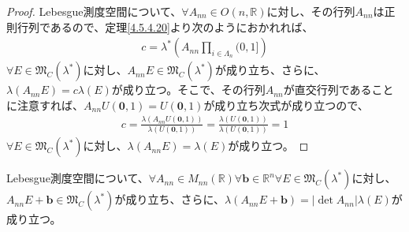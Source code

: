 \documentclass[dvipdfmx]{jsarticle}
\begin{document}
\begin{proof}
Lebesgue測度空間について、$\forall A_{nn} \in O\left( n,\mathbb{R} \right)$に対し、その行列$A_{nn}$は正則行列であるので、定理\ref{4.5.4.20}より次のようにおかれれば、
\begin{align*}
c = \lambda^{*}\left( A_{nn}\prod_{i \in \varLambda_{n}} (0,1] \right)
\end{align*}
$\forall E \in \mathfrak{M}_{C}\left( \lambda^{*} \right)$に対し、$A_{nn}E \in \mathfrak{M}_{C}\left( \lambda^{*} \right)$が成り立ち、さらに、$\lambda\left( A_{nn}E \right) = c\lambda(E)$が成り立つ。そこで、その行列$A_{nn}$が直交行列であることに注意すれば、$A_{nn}U\left( \mathbf{0},1 \right) = U\left( \mathbf{0},1 \right)$が成り立ち次式が成り立つので、
\begin{align*}
c = \frac{\lambda\left( A_{nn}U\left( \mathbf{0},1 \right) \right)}{\lambda\left( U\left( \mathbf{0},1 \right) \right)} = \frac{\lambda\left( U\left( \mathbf{0},1 \right) \right)}{\lambda\left( U\left( \mathbf{0},1 \right) \right)} = 1
\end{align*}
$\forall E \in \mathfrak{M}_{C}\left( \lambda^{*} \right)$に対し、$\lambda\left( A_{nn}E \right) = \lambda(E)$が成り立つ。
\end{proof}
\begin{thm}\label{4.5.4.22}
Lebesgue測度空間について、$\forall A_{nn} \in M_{nn}\left( \mathbb{R} \right)\forall\mathbf{b} \in \mathbb{R}^{n}\forall E \in \mathfrak{M}_{C}\left( \lambda^{*} \right)$に対し、$A_{nn}E + \mathbf{b} \in \mathfrak{M}_{C}\left( \lambda^{*} \right)$が成り立ち、さらに、$\lambda\left( A_{nn}E + \mathbf{b} \right) = \left| \det A_{nn} \right|\lambda(E)$が成り立つ。
\end{thm}
\end{document}

